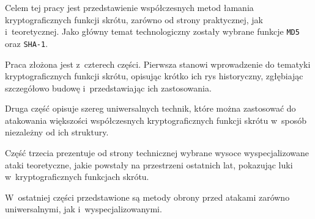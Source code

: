 Celem tej pracy jest przedstawienie współczesnych metod łamania
kryptograficznych funkcji skrótu, zarówno od strony praktycznej, jak
i~teoretycznej. Jako główny temat technologiczny zostały wybrane funkcje
\texttt{MD5} oraz \texttt{SHA-1}.

Praca złożona jest z~czterech części. Pierwsza stanowi wprowadzenie do tematyki
kryptograficznych funkcji skrótu, opisując krótko ich rys historyczny,
zgłębiając szczegółowo budowę i~przedstawiając ich zastosowania.

Druga część opisuje szereg uniwersalnych technik, które można zastosować do
atakowania większości współczesnych kryptograficznych funkcji skrótu w~sposób
niezależny od ich struktury.

Część trzecia prezentuje od strony technicznej wybrane wysoce wyspecjalizowane
ataki teoretyczne, jakie powstały na przestrzeni ostatnich lat, pokazując luki
w~kryptograficznych funkcjach skrótu.

W~ostatniej części przedstawione są metody obrony przed atakami zarówno
uniwersalnymi, jak i~wyspecjalizowanymi.
